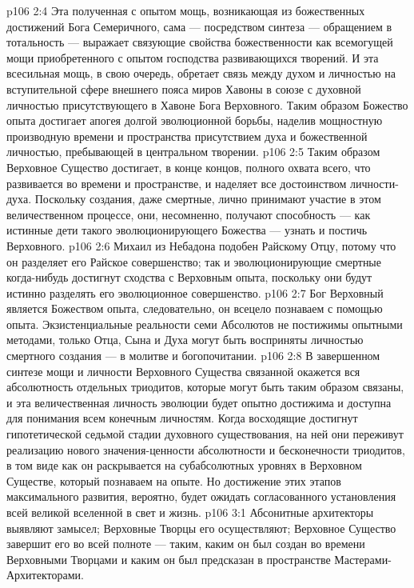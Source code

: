 \vs p106 2:4 Эта полученная с опытом мощь, возникающая из божественных достижений Бога Семеричного, сама --- посредством синтеза --- обращением в тотальность --- выражает связующие свойства божественности как всемогущей мощи приобретенного с опытом господства развивающихся творений. И эта всесильная мощь, в свою очередь, обретает связь между духом и личностью на вступительной сфере внешнего пояса миров Хавоны в союзе с духовной личностью присутствующего в Хавоне Бога Верховного. Таким образом Божество опыта достигает апогея долгой эволюционной борьбы, наделив мощностную производную времени и пространства присутствием духа и божественной личностью, пребывающей в центральном творении.
\vs p106 2:5 Таким образом Верховное Существо достигает, в конце концов, полного охвата всего, что развивается во времени и пространстве, и наделяет все достоинством личности\hyp{}духа. Поскольку создания, даже смертные, лично принимают участие в этом величественном процессе, они, несомненно, получают способность --- как истинные дети такого эволюционирующего Божества --- узнать и постичь Верховного.
\vs p106 2:6 \pc Михаил из Небадона подобен Райскому Отцу, потому что он разделяет его Райское совершенство; так и эволюционирующие смертные когда\hyp{}нибудь достигнут сходства с Верховным опыта, поскольку они будут истинно разделять его эволюционное совершенство.
\vs p106 2:7 \pc Бог Верховный является Божеством опыта, следовательно, он всецело познаваем с помощью опыта. Экзистенциальные реальности семи Абсолютов не постижимы опытными методами, только  Отца, Сына и Духа могут быть восприняты личностью смертного создания --- в молитве и богопочитании.
\vs p106 2:8 В завершенном синтезе мощи и личности Верховного Существа связанной окажется вся абсолютность отдельных триодитов, которые могут быть таким образом связаны, и эта величественная личность эволюции будет опытно достижима и доступна для понимания всем конечным личностям. Когда восходящие достигнут гипотетической седьмой стадии духовного существования, на ней они переживут реализацию нового значения\hyp{}ценности абсолютности и бесконечности триодитов, в том виде как он раскрывается на субабсолютных уровнях в Верховном Существе, который познаваем на опыте. Но достижение этих этапов максимального развития, вероятно, будет ожидать согласованного установления всей великой вселенной в свет и жизнь.
\vs p106 3:1 Абсонитные архитекторы выявляют замысел; Верховные Творцы его осуществляют; Верховное Существо завершит его во всей полноте --- таким, каким он был создан во времени Верховными Творцами и каким он был предсказан в пространстве Мастерами\hyp{}Архитекторами.
